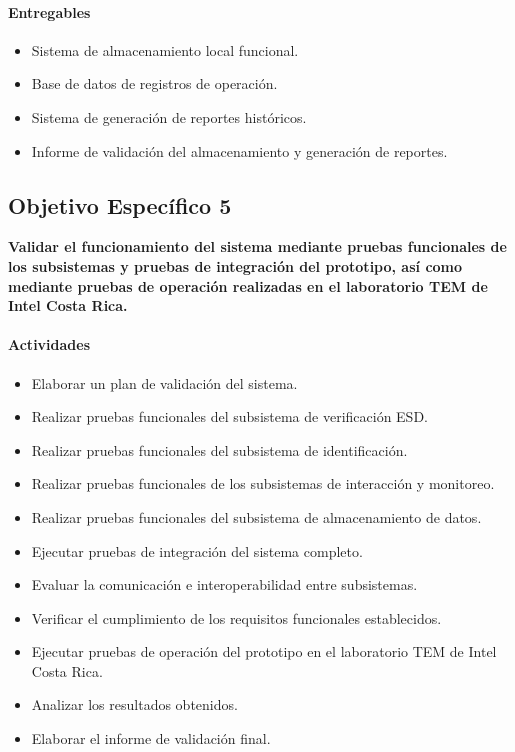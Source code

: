 \paragraph{Entregables}

\begin{itemize}
    \item Sistema de almacenamiento local funcional.
    \item Base de datos de registros de operación.
    \item Sistema de generación de reportes históricos.
    \item Informe de validación del almacenamiento y generación de reportes.
\end{itemize}


\subsection{Objetivo Específico 5}

\textbf{Validar el funcionamiento del sistema mediante pruebas funcionales de los subsistemas 
y pruebas de integración del prototipo, así como mediante pruebas de operación realizadas en el laboratorio TEM de Intel Costa Rica.}

\paragraph{Actividades}

\begin{itemize}
    \item Elaborar un plan de validación del sistema.
    \item Realizar pruebas funcionales del subsistema de verificación ESD.
    \item Realizar pruebas funcionales del subsistema de identificación.
    \item Realizar pruebas funcionales de los subsistemas de interacción y monitoreo.
    \item Realizar pruebas funcionales del subsistema de almacenamiento de datos.
    \item Ejecutar pruebas de integración del sistema completo.
    \item Evaluar la comunicación e interoperabilidad entre subsistemas.
    \item Verificar el cumplimiento de los requisitos funcionales establecidos.
    \item Ejecutar pruebas de operación del prototipo en el laboratorio TEM de Intel Costa Rica.
    \item Analizar los resultados obtenidos.
    \item Elaborar el informe de validación final.
\end{itemize}

